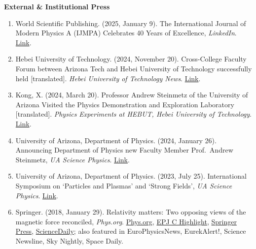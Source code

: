 \documentclass[11pt]{article}
\begin{document}
{\Large\textbf{External \& Institutional Press}}

\begin{enumerate}[leftmargin=*,nosep]
  \item World Scientific Publishing. (2025, January 9). The International Journal of Modern Physics A (IJMPA) Celebrates 40 Years of Excellence, \textit{LinkedIn}. \href{https://www.linkedin.com/posts/world-scientific-publishing_the-international-journal-of-modern-physics-activity-7282999555967610880-SJ78}{Link}.
  \item Hebei University of Technology. (2024, November 20). Cross-College Faculty Forum between Arizona Tech and Hebei University of Technology successfully held [translated]. \textit{Hebei University of Technology News}. \href{https://web.archive.org/web/20250628230434/https://hatech.hebut.edu.cn/xw/62ff3dcc665b453898ec92841d45e0ce.htm}{Link}.
  \item Kong, X. (2024, March 20). Professor Andrew Steinmetz of the University of Arizona Visited the Physics Demonstration and Exploration Laboratory [translated]. \textit{Physics Experiments at HEBUT, Hebei University of Technology}. \href{https://web.archive.org/web/20250629152037/https://mp.weixin.qq.com/s?__biz=Mzg4Njg3NjQyMw==&mid=2247484302&idx=1&sn=273f88bc0332d9a34a9fdbee01b196b3&chksm=cf93b3e6f8e43af0b75b832801bbe9e684d258f00c3671e7e625bfccde7c74a387ef9e5a9926&mpshare=1&scene=24&srcid=0320Wt3iZMGOxbLpRBZg9nYA}{Link}.
  \item University of Arizona, Department of Physics. (2024, January 26). Announcing Department of Physics new Faculty Member Prof.\ Andrew Steinmetz, \textit{UA Science Physics}. \href{https://w3.physics.arizona.edu/news/announcing-department-physics-new-faculty-member-prof-andrew-steinmetz}{Link}.
  \item University of Arizona, Department of Physics. (2023, July 25). International Symposium on ‘Particles and Plasmas’ and ‘Strong Fields’, \textit{UA Science Physics}. \href{https://w3.physics.arizona.edu/news/international-symposium-particles-and-plasmas-and-strong-fields}{Link}.
  \item Springer. (2018, January 29). Relativity matters: Two opposing views of the magnetic force reconciled, \textit{Phys.org}. \href{https://phys.org/news/2018-01-relativity-opposing-views-magnetic.html}{Phys.org}, \href{https://www.epj.org/epjc-news/1422-epjc-highlight-relativity-matters-two-opposing-views-of-the-magnetic-force-reconciled}{EPJ C Highlight}, \href{https://www.springer.com/gp/about-springer/media/research-news/all-english-research-news/relativity-matters--two-opposing-views-of-the-magnetic-force-reconciled/15417658}{Springer Press}, \href{https://www.sciencedaily.com/releases/2018/01/180129131327.htm}{ScienceDaily}; also featured in EuroPhysicsNews, EurekAlert!, Science Newsline, Sky Nightly, Space Daily.
\end{enumerate}
\end{document}
